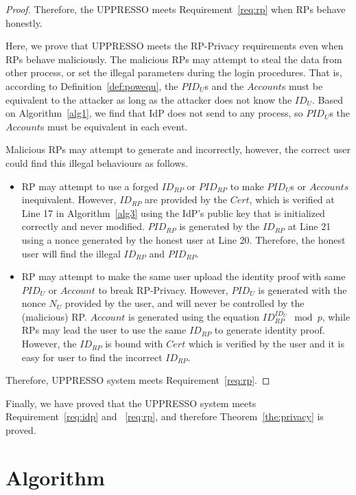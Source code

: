 \begin{appendices}
\begin{proof}
Therefore, the UPPRESSO meets Requirement~\ref{req:rp} when RPs behave honestly.

Here, we prove that UPPRESSO meets the RP-Privacy requirements even when RPs behave maliciously. 
The malicious RPs may attempt to steal the data from other process, or set the illegal parameters during the login procedures. That is, according to Definition~\ref{def:powequ}, the $PID_U$s and the $Account$s must be equivalent to the attacker as long as the attacker does not know the $ID_U$. Based on Algorithm~\ref{alg1}, we  find  that IdP does not send  to any process, so  $PID_U$s the $Account$s must be equivalent in each event.

Malicious RPs may attempt to generate   and  incorrectly, however, the correct user could find this illegal behaviours as follows.
\begin{itemize}
\item RP may attempt to use a forged $ID_{RP}$ or $PID_{RP}$ to make $PID_U$s or $Accounts$ inequivalent. However, $ID_{RP}$ are provided by the $Cert$, which is verified at Line 17 in Algorithm~\ref{alg3} using the IdP's public key that is initialized correctly and never modified.  $PID_{RP}$ is generated by the $ID_{RP}$ at Line 21 using a nonce generated by the honest user at Line 20. Therefore, the honest user will find the illegal $ID_{RP}$ and $PID_{RP}$.
\item RP may attempt to make the same user  upload the identity proof with same $PID_U$ or $Account$ to break RP-Privacy. However, $PID_U$ is generated with the nonce $N_U$ provided by the user, and will never be controlled by the (malicious) RP. $Account$ is generated using the equation $ID_{RP}^{ID_U} \mod p$, while RPs may lead the user to use the same $ID_{RP}$ to generate identity proof. However, the $ID_{RP}$ is bound with $Cert$ which is verified by the user and it is easy for user to find the incorrect $ID_{RP}$.
\end{itemize}

Therefore,  UPPRESSO system meets Requirement~\ref{req:rp}.
\end{proof}
Finally, we have proved that the UPPRESSO system meets Requirement~\ref{req:idp} and ~\ref{req:rp}, and therefore Theorem~\ref{the:privacy} is proved.

\onecolumn

\section{Algorithm}
\label{ape:alg}


\end{appendices}

